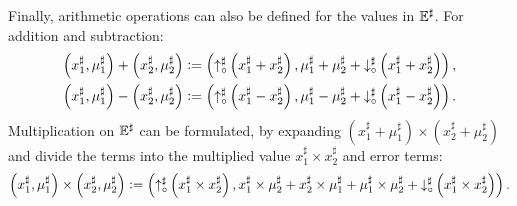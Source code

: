 Finally, arithmetic operations can also be defined for the values in
$\mathbb{E}^\sharp$.  For addition and subtraction:
\begin{equation}
    \begin{aligned}
    \left( x^\sharp_1, \mu^\sharp_1 \right) +
    \left( x^\sharp_2, \mu^\sharp_2 \right)
    &\vcentcolon=
        \left(
            \operatorname{\uparrow^\sharp_\circ}\left(x^\sharp_1 + x^\sharp_2\right),
            \mu^\sharp_1 + \mu^\sharp_2 +
            \operatorname{\downarrow^\sharp_\circ}\left(x^\sharp_1 + x^\sharp_2\right)
        \right), \\
    \left( x^\sharp_1, \mu^\sharp_1 \right) -
    \left( x^\sharp_2, \mu^\sharp_2 \right)
    &\vcentcolon=
        \left(
            \operatorname{\uparrow^\sharp_\circ}\left(x^\sharp_1 - x^\sharp_2\right),
            \mu^\sharp_1 - \mu^\sharp_2 +
            \operatorname{\downarrow^\sharp_\circ}\left(x^\sharp_1 - x^\sharp_2\right)
        \right).
    \end{aligned}
    \label{bg:eq:error_arithmetic}
\end{equation}
Multiplication on $\mathbb{E}^\sharp$ can be formulated, by expanding $\left(
x^\sharp_1 + \mu^\sharp_1 \right) \times \left( x^\sharp_2 + \mu^\sharp_2
\right)$ and divide the terms into the multiplied value $x^\sharp_1 \times
x^\sharp_2$ and error terms:
\begin{equation}
    \left( x^\sharp_1, \mu^\sharp_1 \right) \times
    \left( x^\sharp_2, \mu^\sharp_2 \right)
    \vcentcolon=
        \left(
            \operatorname{\uparrow^\sharp_\circ}\left(x^\sharp_1 \times x^\sharp_2\right),
            x^\sharp_1 \times \mu^\sharp_2 + x^\sharp_2 \times \mu^\sharp_1 +
            \mu^\sharp_1 \times \mu^\sharp_2 +
            \operatorname{\downarrow^\sharp_\circ}\left(x^\sharp_1 \times x^\sharp_2\right)
        \right).
    \label{bg:eq:error_arithmetic_mult}
\end{equation}

